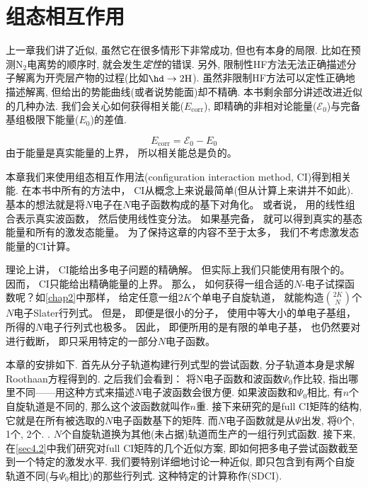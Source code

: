 \chapter{组态相互作用}
上一章我们讲了\hft 近似, 
虽然它在很多情形下非常成功, 
但也有本身的局限. 
\hft 比如在预测$\text{N}_2$电离势的顺序时, 
就会发生\emph{定性}的错误. 
另外, 
限制性HF方法无法正确描述分子解离为开壳层产物的过程(比如$\hd\to2\text{H}$). 
虽然非限制HF方法可以定性正确地描述解离, 
但给出的势能曲线(或者说势能面)却不精确. 
本书剩余部分讲述改进\hft 近似的几种办法. 
我们会关心如何获得相关能($E_\mathrm{corr}$), 
即精确的非相对论能量($\mathscr{E}_0$)与完备基组极限下\hft 能量($E_0$)的差值.

\begin{equation}
E_\mathrm{corr}=\mathscr{E}_0-E_0
\end{equation}
由于\hft 能量是真实能量的上界，
所以相关能总是负的。


本章我们来使用组态相互作用法(configuration interaction method, 
CI)得到相关能. 
在本书中所有的方法中，
CI从概念上来说最简单(但从计算上来讲并不如此). 
基本的想法就是将$N$电子\ha 在$N$电子函数构成的基下对角化。
或者说，
用的线性组合表示真实波函数，
然后使用线性变分法。
如果基完备，
就可以得到真实的基态能量和所有的激发态能量。
为了保持这章的内容不至于太多，
我们不考虑激发态能量的CI计算。



理论上讲，
CI能给出多电子问题的精确解。
但实际上我们只能使用有限个的。
因而，
CI只能给出精确能量的上界。
那么，
如何获得一组合适的$N$-电子试探函数呢？如\autoref{chap2}中那样，
给定任意一组$2K$个单电子自旋轨道，
就能构造$\binom{2K}{N}$个$N$电子Slater行列式。
但是，
即便是很小的分子，
使用中等大小的单电子基组，
所得的$N$电子行列式也极多。
因此，
即便所用的是有限的单电子基，
也仍然要对进行截断，
即只采用特定的一部分$N$电子函数。



本章的安排如下. 
首先从\hft 分子轨道构建行列式型的尝试函数, 
分子轨道本身是求解Roothaan方程得到的. 
之后我们会看到： 将N电子函数和\hft 波函数$\Psi_0$作比较, 
指出哪里不同——用这种方式来描述$N$电子波函数会很方便. 
如果波函数和$\Psi_0$相比, 
有$n$个自旋轨道是不同的, 
那么这个波函数就叫作$n$重. 
接下来研究的是full CI矩阵的结构, 
它就是\ha 在所有被选取的$N$电子函数基下的矩阵. 
而$N$电子函数就是从$\Psi$出发, 
将0个, 
1个, 
2个.
. 
$N$个自旋轨道换为其他(未占据)轨道而生产的一组行列式函数. 
接下来, 
在\autoref{sec4.2}中我们研究对full CI矩阵的几个近似方案, 
即如何把多电子尝试函数截至到一个特定的激发水平. 
我们要特别详细地讨论一种近似, 
即只包含到有两个自旋轨道不同(与$\Psi_0$相比)的那些行列式. 
这种特定的计算称作(SDCI).


